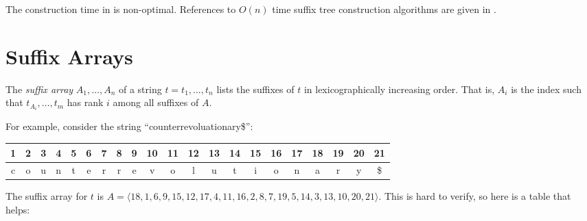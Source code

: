 The construction time in  is non-optimal.
References to $O(n)$ time suffix tree construction algorithms are given
in .


\section{Suffix Arrays}

The \emph{suffix array} $A_1,\ldots,A_n$ of a string $t=t_1,\ldots,t_n$ lists
the suffixes of $t$ in lexicographically increasing order.  That is,
$A_i$ is the index such that $t_{A_{i}},\ldots,t_m$ has rank $i$ among
all suffixes of $A$.  

For example, consider the string ``counterrevoluationary\$'':
\begin{center}
  \begin{tabular}{|c|c|c|c|c|c|c|c|c|c|c|c|c|c|c|c|c|c|c|c|c|}\hline
     1&2&3&4&5&6&7&8&9&10&11&12&13&14&15&16&17&18&19&20&21\\\hline
     c&o&u&n&t&e&r&r&e&v&o&l&u&t&i&o&n&a&r&y&\$\\\hline
  \end{tabular}
\end{center}
The suffix array for $t$ is
$A=\langle18,1,6,9,15,12,17,4,11,16,2,8,7,19,5,14,3,13,10,20,21\rangle$.  This is hard to verify, so here is a table that helps:

